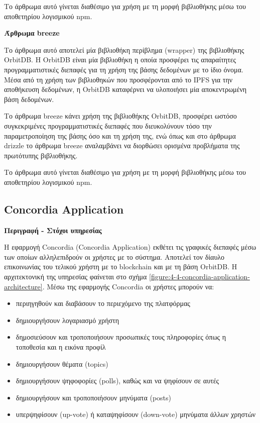 Το άρθρωμα αυτό γίνεται διαθέσιμο για χρήση με τη μορφή βιβλιοθήκης μέσω του αποθετηρίου λογισμικού npm.

\vspace{0.5cm}
\textbf{Άρθρωμα breeze}

Το άρθρωμα αυτό αποτελεί μία βιβλιοθήκη περίβλημα (wrapper) της βιβλιοθήκης OrbitDB. Η OrbitDB είναι μία βιβλιοθήκη η οποία προσφέρει τις απαραίτητες προγραμματιστικές διεπαφές για τη χρήση της βάσης δεδομένων με το ίδιο όνομα. Μέσα από τη χρήση των βιβλιοθηκών που προσφέρονται από το IPFS για την αποθήκευση δεδομένων, η OrbitDB καταφέρνει να υλοποιήσει μία αποκεντρωμένη βάση δεδομένων.

Το άρθρωμα breeze κάνει χρήση της βιβλιοθήκης OrbitDB, προσφέρει ωστόσο συγκεκριμένες προγραμματιστικές διεπαφές που διευκολύνουν τόσο την παραμετροποίηση της βάσης όσο και τη χρήση της, ενώ όπως και στο άρθρωμα drizzle το άρθρωμα breeze αναλαμβάνει να διορθώσει ορισμένα προβλήματα της πρωτότυπης βιβλιοθήκης.

Το άρθρωμα αυτό γίνεται διαθέσιμο για χρήση με τη μορφή βιβλιοθήκης μέσω του αποθετηρίου λογισμικού npm.

\subsection{Concordia Application} \label{subsection:4-4-concordia-application-service}

\vspace{0.5cm}
\textbf{Περιγραφή - Στόχοι υπηρεσίας}

Η εφαρμογή Concordia (Concordia Application) εκθέτει τις γραφικές διεπαφές μέσω των οποίων αλληλεπιδρούν οι χρήστες με το σύστημα. Αποτελεί τον δίαυλο επικοινωνίας του τελικού χρήστη με το blockchain και με τη βάση OrbitDB. Η αρχιτεκτονική της υπηρεσίας φαίνεται στο σχήμα \ref{figure:4-4-concordia-application-architecture}. Μέσω της εφαρμογής Concordia οι χρήστες μπορούν να:

\begin{itemize}
    \item περιηγηθούν και διαβάσουν το περιεχόμενο της πλατφόρμας

    \item δημιουργήσουν λογαριασμό χρήστη

    \item δημοσιεύσουν και τροποποιήσουν προσωπικές τους πληροφορίες όπως η τοποθεσία και η εικόνα προφίλ

    \item δημιουργήσουν θέματα (topics)

    \item δημιουργήσουν ψηφοφορίες (polls), καθώς και να ψηφίσουν σε αυτές

    \item δημιουργήσουν και τροποποιήσουν μηνύματα (posts)

    \item υπερψηφίσουν (up-vote) ή καταψηφίσουν (down-vote) μηνύματα άλλων χρηστών
\end{itemize}

